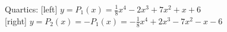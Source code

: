 \begin{figure}
\caption{Quartics: [left] ${y=P_1(x) = \frac{1}{8}  x^4 -2 x^3 + 7  x^2 + x + 6}$ \\[2pt]
[right] ${y=P_2(x) = -P_1(x) = -\frac{1}{8}  x^4 +2 x^3 - 7  x^2 - x - 6}$}
\label{fig.quartic}
\end{figure}
